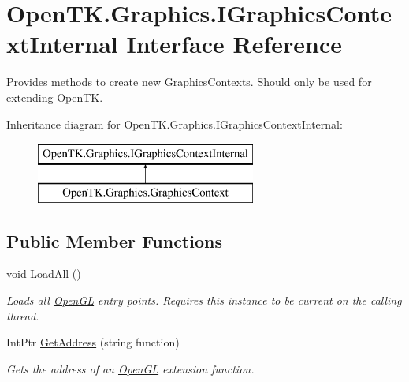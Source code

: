 \hypertarget{interface_open_t_k_1_1_graphics_1_1_i_graphics_context_internal}{\section{Open\-T\-K.\-Graphics.\-I\-Graphics\-Context\-Internal Interface Reference}
\label{interface_open_t_k_1_1_graphics_1_1_i_graphics_context_internal}
}


Provides methods to create new Graphics\-Contexts. Should only be used for extending \hyperlink{namespace_open_t_k}{Open\-T\-K}.  


Inheritance diagram for Open\-T\-K.\-Graphics.\-I\-Graphics\-Context\-Internal\-:\begin{figure}[H]
\begin{center}
\leavevmode
\includegraphics[height=2.000000cm]{interface_open_t_k_1_1_graphics_1_1_i_graphics_context_internal}
\end{center}
\end{figure}
\subsection*{Public Member Functions}
\begin{DoxyCompactItemize}
\item 
void \hyperlink{interface_open_t_k_1_1_graphics_1_1_i_graphics_context_internal_ac92fd883ec02b0391e3fcdbbdbd42d34}{Load\-All} ()
\begin{DoxyCompactList}\small\item\em Loads all \hyperlink{namespace_open_t_k_1_1_graphics_1_1_open_g_l}{Open\-G\-L} entry points. Requires this instance to be current on the calling thread. \end{DoxyCompactList}\item 
Int\-Ptr \hyperlink{interface_open_t_k_1_1_graphics_1_1_i_graphics_context_internal_af59790e0ad84f23c0ffe4a0b5655acca}{Get\-Address} (string function)
\begin{DoxyCompactList}\small\item\em Gets the address of an \hyperlink{namespace_open_t_k_1_1_graphics_1_1_open_g_l}{Open\-G\-L} extension function. \end{DoxyCompactList}\end{DoxyCompactItemize}
